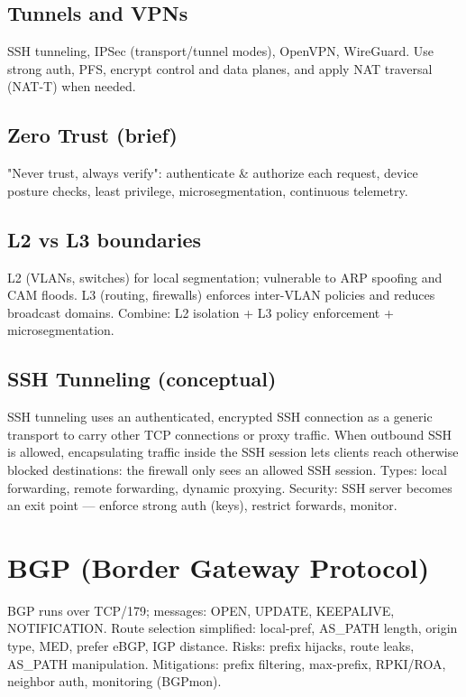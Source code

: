\documentclass[11pt]{article}
\begin{document}
\subsection{Tunnels and VPNs}
SSH tunneling, IPSec (transport/tunnel modes), OpenVPN, WireGuard. Use strong auth, PFS, encrypt control and data planes, and apply NAT traversal (NAT-T) when needed.

\subsection{Zero Trust (brief)}
"Never trust, always verify": authenticate & authorize each request, device posture checks, least privilege, microsegmentation, continuous telemetry.

\subsection{L2 vs L3 boundaries}
L2 (VLANs, switches) for local segmentation; vulnerable to ARP spoofing and CAM floods. L3 (routing, firewalls) enforces inter-VLAN policies and reduces broadcast domains. Combine: L2 isolation + L3 policy enforcement + microsegmentation.

\subsection{SSH Tunneling (conceptual)}
SSH tunneling uses an authenticated, encrypted SSH connection as a generic transport to carry other TCP connections or proxy traffic. When outbound SSH is allowed, encapsulating traffic inside the SSH session lets clients reach otherwise blocked destinations: the firewall only sees an allowed SSH session. Types: local forwarding, remote forwarding, dynamic proxying. Security: SSH server becomes an exit point — enforce strong auth (keys), restrict forwards, monitor.

\section{BGP (Border Gateway Protocol)}
BGP runs over TCP/179; messages: OPEN, UPDATE, KEEPALIVE, NOTIFICATION. Route selection simplified: local-pref, AS_PATH length, origin type, MED, prefer eBGP, IGP distance. Risks: prefix hijacks, route leaks, AS_PATH manipulation. Mitigations: prefix filtering, max-prefix, RPKI/ROA, neighbor auth, monitoring (BGPmon).
\end{document}
